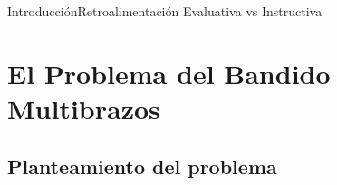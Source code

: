 \documentclass[10pt, envcountsect, handout, aspectratio=1610, hyperref={hypertexnames=true}]{beamer}
\begin{document}
\begin{frame}{Introducción}{Retroalimentación Evaluativa vs Instructiva}
\end{frame}






\section{El Problema del Bandido Multibrazos}



\subsection{Planteamiento del problema}


\end{document}
